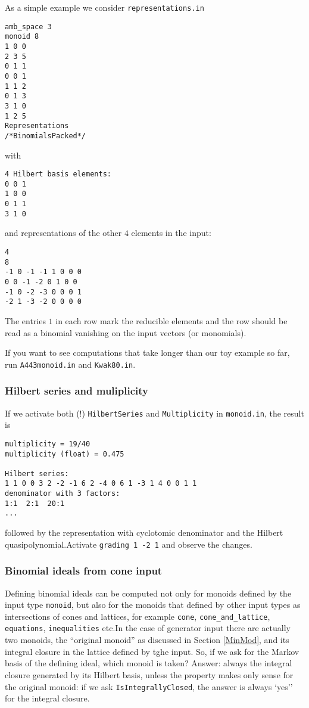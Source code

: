 As a simple example we consider \verb|representations.in|
\begin{Verbatim}
amb_space 3
monoid 8
1 0 0
2 3 5
0 1 1
0 0 1
1 1 2
0 1 3
3 1 0
1 2 5
Representations
/*BinomialsPacked*/
\end{Verbatim}
with
\begin{Verbatim}
4 Hilbert basis elements:
0 0 1
1 0 0
0 1 1
3 1 0
\end{Verbatim}
and representations of the other $4$ elements in the input:
\begin{Verbatim}
4
8
-1 0 -1 -1 1 0 0 0 
0 0 -1 -2 0 1 0 0 
-1 0 -2 -3 0 0 0 1 
-2 1 -3 -2 0 0 0 0
\end{Verbatim}
The entries $1$ in each row mark the reducible elements and the row should be read as a binomial vanishing on the input vectors (or monomials).

If you want to see computations that take longer than our toy example so far, run \verb|A443monoid.in| and \verb|Kwak80.in|.


\subsubsection{Hilbert series and muliplicity}

If we activate both (!) \verb|HilbertSeries| and \verb|Multiplicity| in \verb|monoid.in|, the result is
\begin{Verbatim}
multiplicity = 19/40
multiplicity (float) = 0.475

Hilbert series:
1 1 0 0 3 2 -2 -1 6 2 -4 0 6 1 -3 1 4 0 0 1 1 
denominator with 3 factors:
1:1  2:1  20:1 
... 
\end{Verbatim}
followed by the representation with cyclotomic denominator and the Hilbert quasipolynomial.Activate \verb|grading 1 -2 1| and observe the changes.



\subsubsection{Binomial ideals from cone input}

Defining binomial ideals can be computed not only for monoids defined by the input type \verb|monoid|, but also for the monoids that defined by other input types as intersections of cones and lattices, for example \verb|cone|, \verb|cone_and_lattice|, \verb|equations|, \verb|inequalities| etc.In the case of generator input there are actually two monoids, the ``original monoid'' as discussed in Section \ref{MinMod}, and its integral closure in the lattice defined by tghe input. So, if we ask for the Markov basis of the defining ideal, which monoid is taken? Answer: always the integral closure generated by its Hilbert basis, unless the property makes only sense for the original monoid: if we ask \verb|IsIntegrallyClosed|, the answer is always `yes''  for the integral closure.

